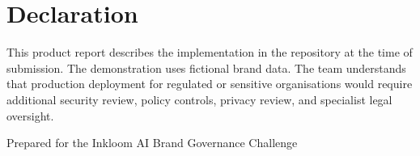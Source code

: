 \documentclass[11pt,a4paper]{article}
\begin{document}
\section{Declaration}

This product report describes the implementation in the repository at the time of
submission. The demonstration uses fictional brand data. The team understands that
production deployment for regulated or sensitive organisations would require additional
security review, policy controls, privacy review, and specialist legal oversight.

\vfill
\begin{center}
\textcolor{muted}{\small Prepared for the Inkloom AI Brand Governance Challenge}
\end{center}
\end{document}
